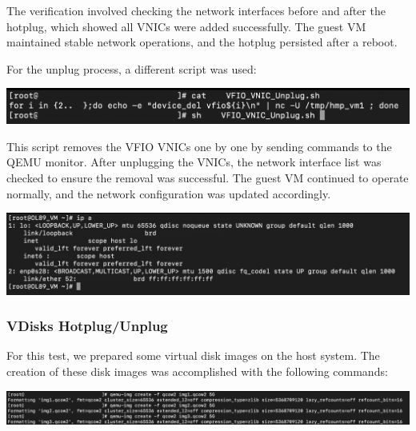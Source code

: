 The verification involved checking the network interfaces before and after the hotplug, which showed all VNICs were added successfully. The guest VM maintained stable network operations, and the hotplug persisted after a reboot.\mynewline

For the unplug process, a different script was used:

\begin{center}
    \centering
    \includegraphics[width=\textwidth]{Images/24 VFIO VNIC Unplug Script.png}
    \label{fig}
\end{center}

This script removes the VFIO VNICs one by one by sending commands to the QEMU monitor. After unplugging the VNICs, the network interface list was checked to ensure the removal was successful. The guest VM continued to operate normally, and the network configuration was updated accordingly.

\begin{center}
    \centering
    \includegraphics[width=\textwidth]{Images/ip a after VFIO Unplug.png}
    \label{fig}
\end{center}


\subsubsection[VDisks Hotplug/Unplug]{VDisks Hotplug/Unplug}
For this test, we prepared some virtual disk images on the host system. The creation of these disk images was accomplished with the following commands:

\begin{center}
    \centering
    \includegraphics[width=\textwidth]{Images/Creating 3 vDisks.png}
    \label{fig}
\end{center}

